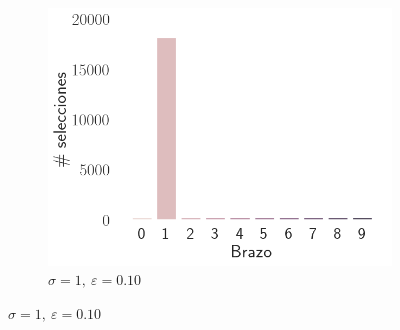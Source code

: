 \documentclass[12pt]{article}
\begin{document}
\begin{figure}[H]
\begin{subfigure}[H]{0.3\textwidth}
            \includegraphics[width=\textwidth]{../img/arm_sigma_1_epsilon_0.1}
            \caption{$\sigma=1 ,\ \varepsilon=0.10$}
            \label{fig:arms_selected_1_0.1}
        \end{subfigure}


\end{figure}
\end{document}
